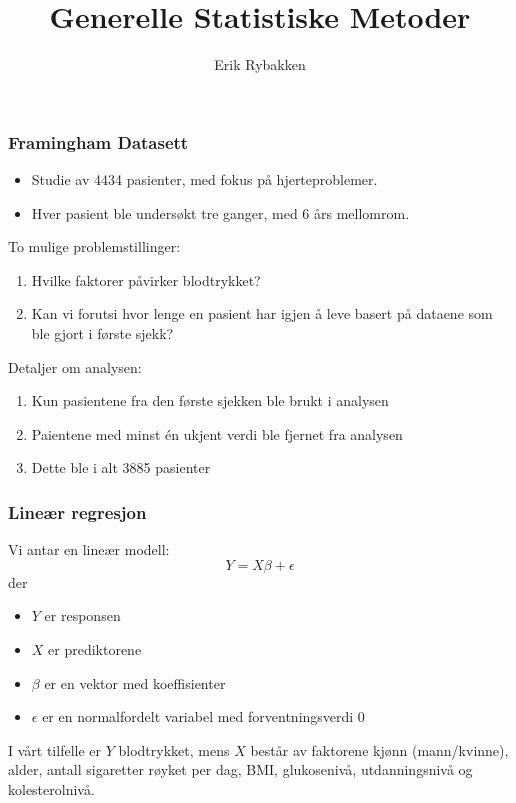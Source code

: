 \documentclass[aspectratio=169]{beamer}
\title{Generelle Statistiske Metoder}
\author{Erik Rybakken}
\begin{document}
\frame{\titlepage}

\begin{frame}
  \frametitle{Framingham Datasett}
  \begin{itemize}
    \item Studie av 4434 pasienter, med fokus på hjerteproblemer.
    \pause
    \item Hver pasient ble undersøkt tre ganger, med 6 års mellomrom.
  \end{itemize}

  \pause

  To mulige problemstillinger:
  \begin{enumerate}
    \item Hvilke faktorer påvirker blodtrykket?
    \pause
    \item Kan vi forutsi hvor lenge en pasient har igjen å leve basert på dataene som ble gjort i første sjekk?
  \end{enumerate}
  Detaljer om analysen:
  \begin{enumerate}
    \item Kun pasientene fra den første sjekken ble brukt i analysen
    \pause
    \item Paientene med minst én ukjent verdi ble fjernet fra analysen
    \pause
    \item Dette ble i alt 3885 pasienter
  \end{enumerate}
\end{frame}

\begin{frame}
  \frametitle{Lineær regresjon}
  Vi antar en lineær modell:
  \begin{equation}
    Y = X \beta + \epsilon
  \end{equation}
  \pause
  der
  \begin{itemize}
    \item \(Y\) er responsen
    \item \(X\) er prediktorene
    \item \(\beta\) er en vektor med koeffisienter
    \item \(\epsilon\) er en normalfordelt variabel med forventningsverdi 0
  \end{itemize}
  \pause
  I vårt tilfelle er \(Y\) blodtrykket, mens \(X\) består av faktorene kjønn (mann/kvinne), alder,
  antall sigaretter røyket per dag, BMI, glukosenivå, utdanningsnivå og kolesterolnivå.
\end{frame}
\end{document}
